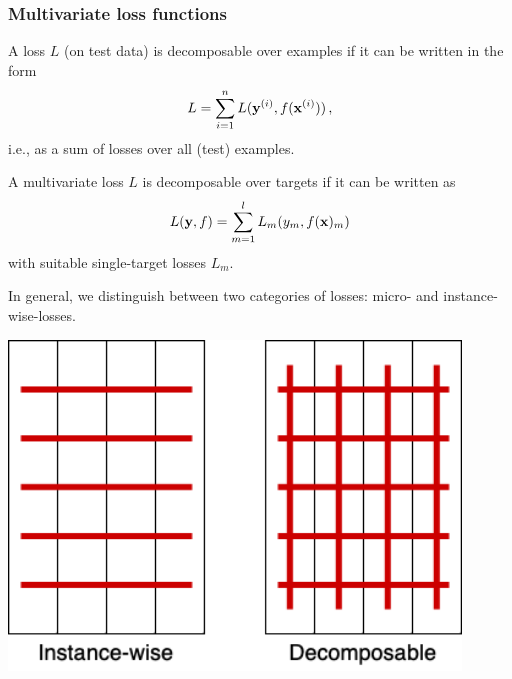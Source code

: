 \documentclass[11pt,compress,t,notes=noshow, xcolor=table]{beamer}
\begin{document}
\begin{frame}
	\frametitle{Multivariate loss functions}
	\small
	\begin{itemize}
%		
%
		\item A loss $L$ (on test data) is decomposable over examples if it can be written in the form
		$$
		L = \sum_{i=1}^n L(\mathbf{y}^{(i)}, f(\mathbf{x}^{(i)})) 
		\, ,
		$$
		i.e., as a sum of losses over all (test) examples. 
		
		
		\item A multivariate loss $L$ is decomposable over targets if it can be written as
		$$
		L(\mathbf{y}, f) = \sum_{m=1}^l L_m(y_m, f(\mathbf{x})_m) 
		$$
		with suitable single-target losses $L_m$. 
		
%		

		\begin{minipage}{0.45\textwidth}
%			
			\item  In general, we distinguish between two categories of losses: micro- and instance-wise-losses. 
%			
		\end{minipage}
%	
		\begin{minipage}{0.45\textwidth}
			\begin{center}
				\includegraphics[width=0.9\textwidth]{figure/fmeasure}
			\end{center}
		\end{minipage}
%		
	\end{itemize}
%
\end{frame}
\end{document}
